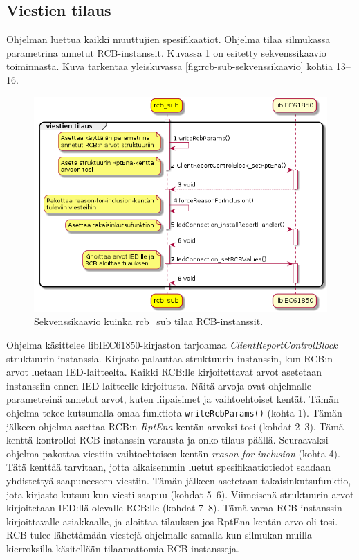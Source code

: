 \subsection{Viestien tilaus}
Ohjelman luettua kaikki muuttujien spesifikaatiot. Ohjelma tilaa silmukassa parametrina annetut RCB-instanssit. Kuvassa \ref{fig:rcb-sub-subscribe-reports} on esitetty sekvenssikaavio toiminnasta. Kuva tarkentaa yleiskuvassa \ref{fig:rcb-sub-sekvenssikaavio} kohtia 13--16.

\begin{figure}[ht!]
	\includegraphics[width=1\textwidth]{pictures/rcb-sub-subscribe-reports.png}
	\caption{Sekvenssikaavio kuinka rcb\_sub tilaa RCB-instanssit.}
	\label{fig:rcb-sub-subscribe-reports}
\end{figure}

Ohjelma käsittelee libIEC61850-kirjaston tarjoamaa \emph{ClientReportControlBlock} struktuurin instanssia. Kirjasto palauttaa struktuurin instanssin, kun RCB:n arvot luetaan IED-laitteelta. Kaikki RCB:lle kirjoitettavat arvot asetetaan instanssiin ennen IED-laitteelle kirjoitusta. Näitä arvoja ovat ohjelmalle parametreinä annetut arvot, kuten liipaisimet ja vaihtoehtoiset kentät. Tämän ohjelma tekee kutsumalla omaa funktiota \texttt{wri\-teRcb\-Pa\-rams\-()} (kohta 1). Tämän jälkeen ohjelma asettaa RCB:n \emph{RptEna}-kentän arvoksi tosi (kohdat 2--3). Tämä kenttä kontrolloi RCB-instanssin varausta ja onko tilaus päällä. Seuraavaksi ohjelma pakottaa viestiin vaihtoehtoisen kentän \emph{reason-for-inclusion} (kohta 4). Tätä kenttää tarvitaan, jotta aikaisemmin luetut spesifikaatiotiedot saadaan yhdistettyä saapuneeseen viestiin. Tämän jälkeen asetetaan takaisinkutsufunktio, jota kirjasto kutsuu kun viesti saapuu (kohdat 5--6). Viimeisenä struktuurin arvot kirjoitetaan IED:llä olevalle RCB:lle (kohdat 7--8). Tämä varaa RCB-instanssin kirjoittavalle asiakkaalle, ja aloittaa tilauksen jos RptEna-kentän arvo oli tosi. RCB tulee lähettämään viestejä ohjelmalle samalla kun silmukan muilla kierroksilla käsitellään tilaamattomia RCB-instansseja.


